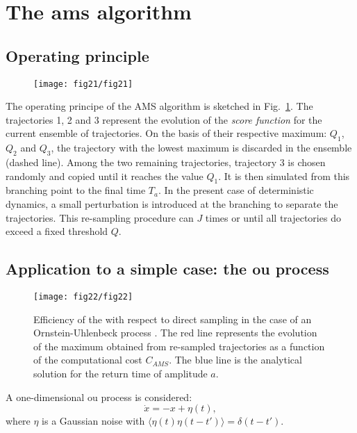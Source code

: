 \section{The \ac{ams} algorithm}
\label{app:ams-short}

\subsection{Operating principle}

\begin{figure}
	\centering
	\texttt{[image: fig21/fig21]}
	\caption{\label{fig:illustr_AMS}  }
\end{figure}


The operating principe of the AMS algorithm is sketched in Fig.~\ref{fig:illustr_AMS}.
%
The trajectories 1, 2 and 3 represent the evolution of the \emph{score function} for the current ensemble of trajectories. On the basis of their respective maximum: $Q_1$, $Q_2$ and $Q_3$, the trajectory with the lowest maximum is discarded in the ensemble (dashed line). Among the two remaining trajectories, trajectory 3 is chosen randomly and copied until it reaches the value $Q_1$. It is then simulated from this branching point to the final time $T_a$. In the present case of deterministic dynamics, a small perturbation is introduced at the branching to separate the trajectories. This re-sampling procedure can  $J$ times or until all trajectories do exceed a fixed threshold $Q$.

\subsection{Application to a simple case: the \acl{ou} process}
	
	\begin{figure}
		\centering
		\texttt{[image: fig22/fig22]}
		\caption{Efficiency of the  with respect to direct sampling in the case of an Ornstein-Uhlenbeck process \citep{lestang_computing_2018}. The red line represents the evolution of the maximum obtained from re-sampled trajectories as a function of the computational cost $C_{AMS}$. The blue line is the analytical solution for the return time of amplitude $a$.}
		\label{fig:comparaison_temps_de_retour}
	\end{figure}
	A one-dimensional \acl{ou} process is considered:
	\begin{equation}
	\label{eq:ou}
	\dot{x} = -x + \eta (t),
	\end{equation}
	where $\eta$ is a Gaussian noise with $\langle \eta(t)\eta(t-t')\rangle = \delta(t-t')$.
	

